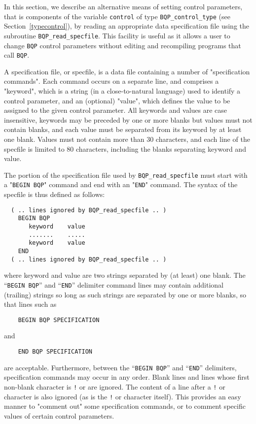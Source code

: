 \documentclass{galahad}
\newcommand{\packagename}{BQP}
\begin{document}

\galfeatures
\noindent In this section, we describe an alternative means of setting 
control parameters, that is components of the variable {\tt control} of type
{\tt \packagename\_control\_type}
(see Section~\ref{typecontrol}), 
by reading an appropriate data specification file using the
subroutine {\tt \packagename\_read\_specfile}. This facility
is useful as it allows a user to change  {\tt \packagename} control parameters 
without editing and recompiling programs that call {\tt \packagename}.

A specification file, or specfile, is a data file containing a number of 
"specification commands". Each command occurs on a separate line, 
and comprises a "keyword", 
which is a string (in a close-to-natural language) used to identify a 
control parameter, and 
an (optional) "value", which defines the value to be assigned to the given
control parameter. All keywords and values are case insensitive, 
keywords may be preceded by one or more blanks but
values must not contain blanks, and
each value must be separated from its keyword by at least one blank.
Values must not contain more than 30 characters, and 
each line of the specfile is limited to 80 characters,
including the blanks separating keyword and value.



The portion of the specification file used by 
{\tt \packagename\_read\_specfile}
must start
with a "{\tt BEGIN \packagename}" command and end with an 
"{\tt END}" command.  The syntax of the specfile is thus defined as follows:
\begin{verbatim}
  ( .. lines ignored by BQP_read_specfile .. )
    BEGIN BQP
       keyword    value
       .......    .....
       keyword    value
    END 
  ( .. lines ignored by BQP_read_specfile .. )
\end{verbatim}
where keyword and value are two strings separated by (at least) one blank.
The ``{\tt BEGIN \packagename}'' and ``{\tt END}'' delimiter command lines 
may contain additional (trailing) strings so long as such strings are 
separated by one or more blanks, so that lines such as
\begin{verbatim}
    BEGIN BQP SPECIFICATION
\end{verbatim}
and
\begin{verbatim}
    END BQP SPECIFICATION
\end{verbatim}
are acceptable. Furthermore, 
between the
``{\tt BEGIN \packagename}'' and ``{\tt END}'' delimiters,
specification commands may occur in any order.  Blank lines and
lines whose first non-blank character is {\tt !} or {\tt *} are ignored. 
The content 
of a line after a {\tt !} or {\tt *} character is also 
ignored (as is the {\tt !} or {\tt *}
character itself). This provides an easy manner to "comment out" some 
specification commands, or to comment specific values 
of certain control parameters.  
\end{document}
